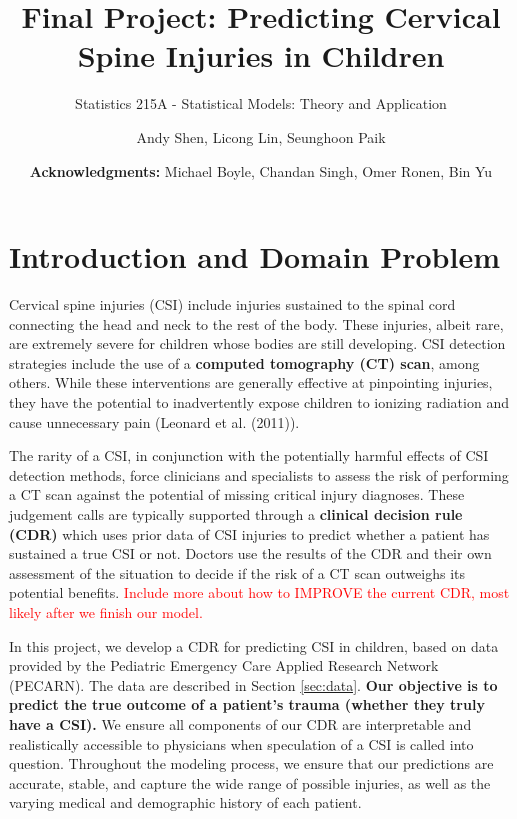 \documentclass[
]{article}
\title{Final Project: Predicting Cervical Spine Injuries in Children}
\subtitle{Statistics 215A - Statistical Models: Theory and Application}
\author{Andy Shen, Licong Lin, Seunghoon Paik}
\date{\textbf{Acknowledgments:} Michael Boyle, Chandan Singh, Omer
Ronen, Bin Yu}
\begin{document}
\maketitle

\newcommand{\blue}{\textcolor{blue}}
\newcommand{\red}{\textcolor{red}}
\newcommand{\bb}{\textbf}

\hypertarget{introduction-and-domain-problem}{%
\section{Introduction and Domain
Problem}\label{introduction-and-domain-problem}}

Cervical spine injuries (CSI) include injuries sustained to the spinal
cord connecting the head and neck to the rest of the body. These
injuries, albeit rare, are extremely severe for children whose bodies
are still developing. CSI detection strategies include the use of a
\textbf{computed tomography (CT) scan}, among others. While these
interventions are generally effective at pinpointing injuries, they have
the potential to inadvertently expose children to ionizing radiation and
cause unnecessary pain (Leonard et al. (2011)).

The rarity of a CSI, in conjunction with the potentially harmful effects
of CSI detection methods, force clinicians and specialists to assess the
risk of performing a CT scan against the potential of missing critical
injury diagnoses. These judgement calls are typically supported through
a \textbf{clinical decision rule (CDR)} which uses prior data of CSI
injuries to predict whether a patient has sustained a true CSI or not.
Doctors use the results of the CDR and their own assessment of the
situation to decide if the risk of a CT scan outweighs its potential
benefits.
\textcolor{red}{Include more about how to IMPROVE the current CDR, most likely after we finish our model.}

In this project, we develop a CDR for predicting CSI in children, based
on data provided by the Pediatric Emergency Care Applied Research
Network (PECARN). The data are described in Section
\textcolor{blue}{\ref{sec:data}}. \textbf{Our objective is to predict
the true outcome of a patient's trauma (whether they truly have a CSI).}
We ensure all components of our CDR are interpretable and realistically
accessible to physicians when speculation of a CSI is called into
question. Throughout the modeling process, we ensure that our
predictions are accurate, stable, and capture the wide range of possible
injuries, as well as the varying medical and demographic history of each
patient.
\end{document}
